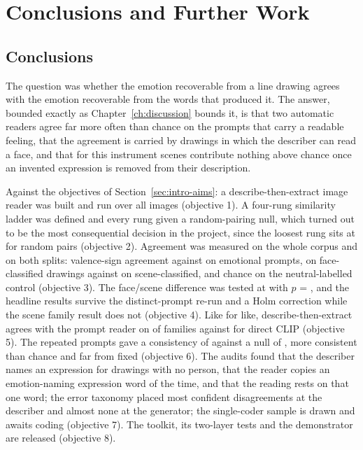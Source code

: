 \chapter{Conclusions and Further Work}
\label{ch:conclusion}

\section{Conclusions}
\label{sec:conc}

The question was whether the emotion recoverable from a line drawing agrees with the emotion recoverable from the words that produced it. The answer, bounded exactly as Chapter~\ref{ch:discussion} bounds it, is that two automatic readers agree far more often than chance on the \nEmotional{} prompts that carry a readable feeling, that the agreement is carried by drawings in which the describer can read a face, and that for this instrument scenes contribute nothing above chance once an invented expression is removed from their description.

Against the objectives of Section~\ref{sec:intro-aims}: a describe-then-extract image reader was built and run over all \nTotal{} images (objective 1). A four-rung similarity ladder was defined and every rung given a random-pairing null, which turned out to be the most consequential decision in the project, since the loosest rung sits at \FullNeuVaNull{} for random pairs (objective 2). Agreement was measured on the whole corpus and on both splits: \FullEmoSignObs{} valence-sign agreement against \FullEmoSignNull{} on emotional prompts, \FullFaceSignObs{} on face-classified drawings against \FullSceneSignObs{} on scene-classified, and chance on the neutral-labelled control (objective 3). The face/scene difference was tested at \DiffSignPp{} with $p$ = \DiffSignP{}, and the headline results survive the distinct-prompt re-run and a Holm correction while the scene family result does not (objective 4). Like for like, describe-then-extract agrees with the prompt reader on \McDeFam{} of families against \McClipFam{} for direct CLIP (objective 5). The repeated prompts gave a consistency of \ConsFam{} against a null of \ConsFamNull{}, more consistent than chance and far from fixed (objective 6). The audits found that the describer names an expression for drawings with no person, that the reader copies an emotion-naming expression word \DescCopyStrict{} of the time, and that the reading rests on that one word; the error taxonomy placed most confident disagreements at the describer and almost none at the generator; the single-coder sample is drawn and awaits coding (objective 7). The toolkit, its two-layer tests and the demonstrator are released (objective 8).

